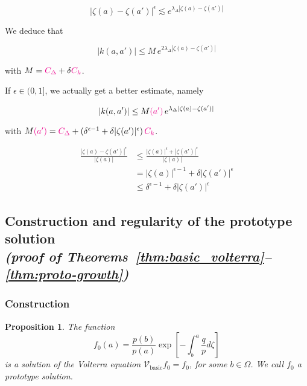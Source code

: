 \documentclass{article}
\theoremstyle{plain}
\newtheorem{prop}{Proposition}
\newcommand{\hardpart}{\mathcal{V}_\text{basic}}
\newenvironment{verify}{\color{ForestGreen}}{\color{black}}
\begin{document}
\[|\zeta(a)-\zeta(a')|^\epsilon\lesssim e^{\lambda_\Delta |\zeta(a)-\zeta(a')|} \]

We deduce that 

\[ |k(a,a')| \leq M\, e^{2 \lambda_\Delta |\zeta(a)-\zeta(a')|} \]

with $M= \textcolor{magenta}{C_\Delta} + \delta \textcolor{magenta}{C_k}$. 

\color{purple}If $\epsilon\in (0,1]$, we actually get a better estimate, namely 

\[ |k(a,a')| \leq M\textcolor{magenta}{(a')}\, e^{ \lambda_\Delta |\zeta(a)-\zeta(a')|} \]

with $M\textcolor{magenta}{(a')} = \textcolor{magenta}{C_\Delta} + (\delta^{\epsilon-1}+\delta |\zeta(a')|^\epsilon ) \,  \textcolor{magenta}{C_k}$.\color{black}

\begin{verify}
    \begin{align*}
        \frac{|\zeta(a)-\zeta(a')|^\epsilon}{|\zeta(a)|} & \leq \frac{|\zeta(a)|^\epsilon + |\zeta(a')|^\epsilon}{|\zeta(a)|}\\
        &= |\zeta(a)|^{\epsilon-1}+ \delta |\zeta(a')|^\epsilon\\
        &\leq \delta^{\epsilon-1}+ \delta |\zeta(a')|^\epsilon 
    \end{align*}
\end{verify}




\subsection{Construction and regularity of the prototype solution \\ \textit{(proof of Theorems~\ref{thm:basic_volterra}--\ref{thm:proto-growth})}}\label{sec:proto-construction-regularity}

\subsubsection{Construction}\label{sec:construction}

\begin{prop}\label{prop:construction}
    The function 
    \begin{equation}%
    f_0(a)=\frac{p(b)}{p(a)} \exp\left[-\int_{b}^{a}\frac{q}{p} d\zeta\right]
   \end{equation}
is a solution of the Volterra equation $\hardpart f_0=f_0$, for some $b\in\Omega$. We call $f_0$ a prototype solution.  
\end{prop}
\end{document}
